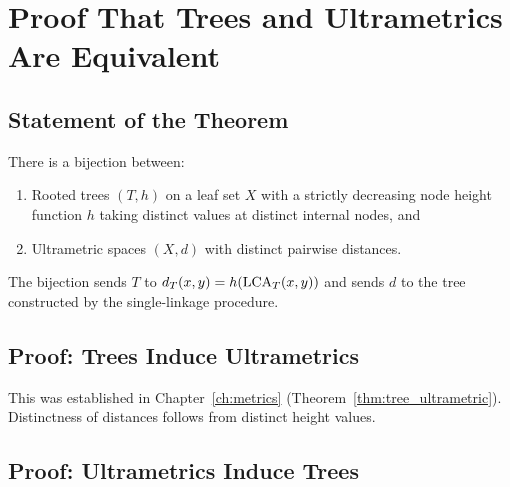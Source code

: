 \chapter{Proof That Trees and Ultrametrics Are Equivalent}
\label{app:ultrametric_equiv}

\section{Statement of the Theorem}

\begin{theorem}
\label{thm:full_equiv}
There is a bijection between:
\begin{enumerate}
  \item Rooted trees $(T, h)$ on a leaf set $X$ with a strictly decreasing node height function $h$ taking distinct values at distinct internal nodes, and
  \item Ultrametric spaces $(X, d)$ with distinct pairwise distances.
\end{enumerate}
The bijection sends $T$ to $d_T(x,y) = h(\operatorname{LCA}_T(x,y))$ and sends $d$ to the tree constructed by the single-linkage procedure.
\end{theorem}

\section{Proof: Trees Induce Ultrametrics}

This was established in Chapter~\ref{ch:metrics} (Theorem~\ref{thm:tree_ultrametric}). Distinctness of distances follows from distinct height values.

\section{Proof: Ultrametrics Induce Trees}


